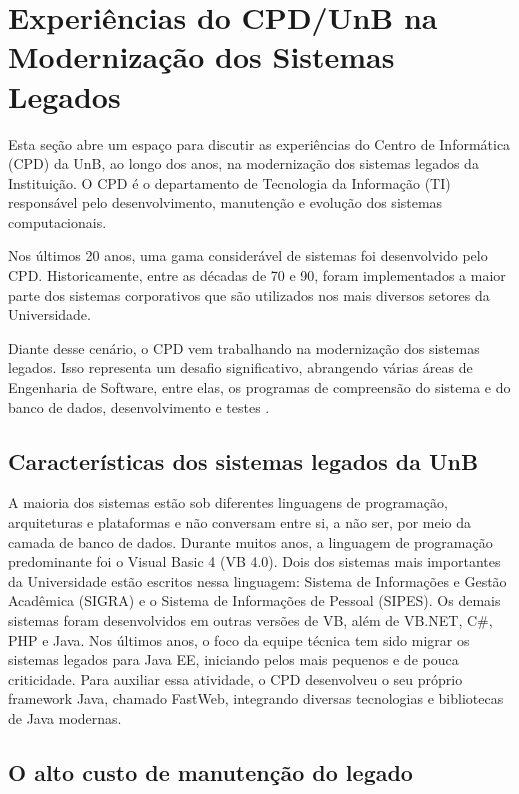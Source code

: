 \section{Experiências do CPD/UnB na Modernização dos Sistemas Legados}

Esta seção abre um espaço para discutir as experiências do Centro de Informática (CPD) da UnB, ao longo dos anos, na modernização dos sistemas legados da Instituição. O \acrshort{CPD} é o departamento de Tecnologia da Informação (TI) responsável pelo desenvolvimento, manutenção e evolução dos sistemas computacionais.

Nos últimos 20 anos, uma gama considerável de sistemas foi desenvolvido pelo CPD. Historicamente, entre as décadas de 70 e 90, foram implementados a maior parte dos sistemas corporativos que são utilizados nos mais diversos setores da Universidade. 

Diante desse cenário, o \acrshort{CPD} vem trabalhando na modernização dos sistemas legados. Isso representa um desafio significativo, abrangendo várias áreas de Engenharia de Software, entre elas, os programas de compreensão do sistema e do banco de dados, desenvolvimento e testes \cite{S3_Bisbal:1999}. 

\subsection{Características dos sistemas legados da UnB}

A maioria dos sistemas estão sob diferentes linguagens de programação, arquiteturas e plataformas e não conversam entre si, a não ser, por meio da camada de banco de dados. Durante muitos anos, a linguagem de programação predominante foi o Visual Basic 4 (VB 4.0). Dois dos sistemas mais importantes da Universidade estão escritos nessa linguagem: Sistema de Informações e Gestão Acadêmica (SIGRA) e o Sistema de Informações de Pessoal (SIPES). Os demais sistemas foram desenvolvidos em outras versões de VB, além de VB.NET, C\#, PHP e Java. Nos últimos anos, o foco da equipe técnica tem sido migrar os sistemas legados para Java EE, iniciando pelos mais pequenos e de pouca criticidade. Para auxiliar essa atividade, o \acrshort{CPD} desenvolveu o seu próprio framework Java, chamado FastWeb, integrando diversas tecnologias e bibliotecas de Java modernas.

\subsection{O alto custo de manutenção do legado}


